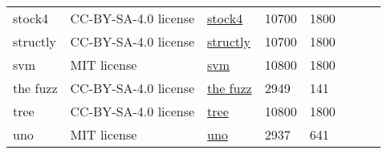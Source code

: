 \begin{table}[t]
{\begin{tabular}{llllllll}
stock4 &CC-BY-SA-4.0 license &\href{https://github.com/dabeaz-course/python-mastery/tree/main/Solutions/8_2}{stock4} &10700 &1800 \\
structly &CC-BY-SA-4.0 license &\href{https://github.com/dabeaz-course/python-mastery/tree/main/Solutions/9_2}{structly} &10700 &1800 \\
svm &MIT license &\href{https://github.com/rushter/MLAlgorithms/tree/master/mla/svm}{svm} &10800 &1800 \\
the fuzz &CC-BY-SA-4.0 license &\href{https://github.com/seatgeek/thefuzz/tree/master/thefuzz}{the fuzz} &2949 &141 \\
tree &CC-BY-SA-4.0 license &\href{https://github.com/rushter/MLAlgorithms/blob/master/mla/ensemble/tree.py}{tree} &10800 &1800 \\
uno &MIT license &\href{https://github.com/datamllab/rlcard/tree/master/rlcard/games/uno}{uno} &2937 &641 \\
\hline
\end{tabular}
}
\label{tab: individual_dataset_py}
\end{table}

